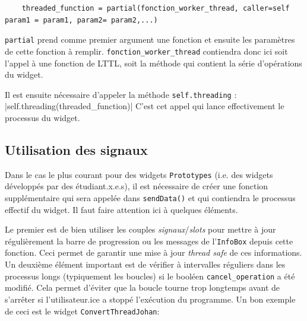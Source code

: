 \documentclass{article}
\begin{document}
\begin{verbatim}
    threaded_function = partial(fonction_worker_thread, caller=self param1 = param1, param2= param2,...)
\end{verbatim}

\texttt{partial} prend comme premier argument une fonction et ensuite les paramètres de cette fonction à remplir. \texttt{fonction\_worker\_thread} contiendra donc ici soit l'appel à une fonction de LTTL, soit la méthode qui contient la série d'opérations du widget.

Il est ensuite nécessaire d'appeler la méthode \texttt{self.threading} :
|self.threading(threaded_function)|
C'est cet appel qui lance effectivement le processus du widget.

\subsection{Utilisation des signaux}

Dans le cas le plus courant pour des widgets \texttt{Prototypes} (i.e. des widgets développés par des étudiant.x.e.s), il est nécessaire de créer une fonction supplémentaire qui sera appelée dans \texttt{sendData()} et qui contiendra le processus effectif du widget. Il faut faire attention ici à quelques éléments.

Le premier est de bien utiliser les couples \textit{signaux}/\textit{slots} pour mettre à jour régulièrement la barre de progression ou les messages de l'\texttt{InfoBox} depuis cette fonction. Ceci permet de garantir une mise à jour \textit{thread safe} de ces informations. 
Un deuxième élément important est de vérifier à intervalles réguliers dans les processus longs (typiquement les boucles) si le booléen \texttt{cancel\_operation} a été modifié. Cela permet d'éviter que la boucle tourne trop longtemps avant de s'arrêter si l'utilisateur.ice a stoppé l'exécution du programme. Un bon exemple de ceci est le widget \texttt{ConvertThreadJohan}:
\end{document}
